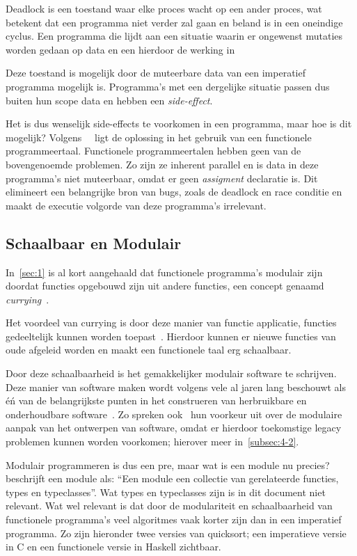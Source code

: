 \documentclass[twoside,twocolumn]{article}
\begin{document}
Deadlock is een toestand waar elke proces wacht op een ander proces, wat
betekent dat een programma niet verder zal gaan en beland is in een oneindige
cyclus. Een programma die lijdt aan een situatie waarin er ongewenst mutaties
worden gedaan op data en een hierdoor de werking in 

Deze toestand is mogelijk  door de muteerbare data van een imperatief
programma mogelijk is. Programma's met een dergelijke situatie passen dus
buiten hun scope data en hebben een \textit{side-effect}.

Het is dus wenselijk side-effects te voorkomen in een programma, maar hoe is
dit mogelijk? Volgens~\citeauthor{src14}~\cite{src14,src15} ligt de oplossing
in het gebruik van een functionele programmeertaal. Functionele
programmeertalen hebben geen van de bovengenoemde problemen. Zo zijn ze
inherent parallel en is data in deze programma's niet muteerbaar, omdat er geen
\textit{assigment} declaratie is. Dit elimineert een belangrijke bron van bugs,
zoals de deadlock en race conditie en maakt de executie volgorde van deze
programma's irrelevant.

\subsection{Schaalbaar en Modulair}
\label{subsec:3-2}

In~\cref{sec:1} is al kort aangehaald dat functionele programma's modulair
zijn doordat functies opgebouwd zijn uit andere functies, een concept genaamd
\textit{currying}~\cite[hfdst.~5]{src16}.

Het voordeel van currying is door deze manier van functie applicatie, functies
gedeeltelijk kunnen worden toepast~\cite{src1}. Hierdoor kunnen er nieuwe
functies van oude afgeleid worden en maakt een functionele taal erg schaalbaar.

Door deze schaalbaarheid is het gemakkelijker modulair software te schrijven.
Deze manier van software maken wordt volgens vele al jaren lang beschouwt als
\'e\'n van de belangrijkste punten in het construeren van herbruikbare en
onderhoudbare software~\cite{src17}. Zo spreken ook~\textcite{src18} hun
voorkeur uit over de modulaire aanpak van het ontwerpen van software, omdat er
hierdoor toekomstige legacy problemen kunnen worden voorkomen; hierover meer
in~\cref{subsec:4-2}.

Modulair programmeren is dus een pre, maar wat is een module nu precies?
\textcite[hdfst.~6]{src16} beschrijft een module als: \enquote{Een module een
collectie van gerelateerde functies, types en typeclasses}. Wat types en
typeclasses zijn is in dit document niet relevant. Wat wel relevant is dat door
de modulariteit en schaalbaarheid van functionele programma's veel algoritmes
vaak korter zijn dan in een imperatief programma. Zo zijn hieronder twee
versies van quicksort; een imperatieve versie in C en een functionele
versie in Haskell zichtbaar.
\end{document}
